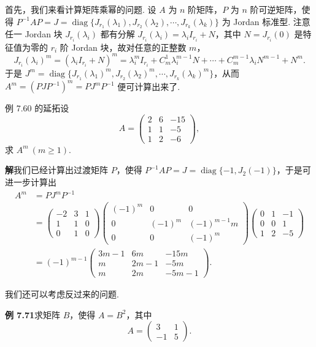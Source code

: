 \documentclass[UTF8,12pt,a4paper,fontset=fandol]{ctexart}
\begin{document}
首先，我们来看计算矩阵乘幂的问题. 设 $A$ 为 $n$ 阶矩阵，$P$ 为 $n$ 阶可逆矩阵，使得 $P^{-1}AP=J=\operatorname{diag}\{J_{r_1}(\lambda_1),J_{r_2}(\lambda_2),\cdots,J_{r_k}(\lambda_k)\}$ 为 Jordan 标准型. 注意任一 Jordan 块 $J_{r_i}(\lambda_i)$ 都有分解 $J_{r_i}(\lambda_i)=\lambda_iI_{r_i}+N$，其中 $N=J_{r_i}(0)$ 是特征值为零的 $r_i$ 阶 Jordan 块，故对任意的正整数 $m$，
\[
J_{r_i}(\lambda_i)^m=(\lambda_iI_{r_i}+N)^m=\lambda_i^mI_{r_i}+C_m^1\lambda_i^{m-1}N+\cdots+C_m^{m-1}\lambda_iN^{m-1}+N^m.
\]
于是 $J^m=\operatorname{diag}\{J_{r_1}(\lambda_1)^m,J_{r_2}(\lambda_2)^m,\cdots,J_{r_k}(\lambda_k)^m\}$，从而 $A^m=(PJP^{-1})^m=PJ^mP^{-1}$ 便可计算出来了.

例 7.60 的延拓\quad 设
\[
A=\left(\begin{array}{rrr}
2&6&-15\\
1&1&-5\\
1&2&-6
\end{array}\right),
\]
求 $A^m\ (m\ge1)$.

\noindent\textbf{解}\quad 我们已经计算出过渡矩阵 $P$，使得 $P^{-1}AP=J=\operatorname{diag}\{-1,J_2(-1)\}$，于是可进一步计算出
\[
\begin{aligned}
A^m&=PJ^mP^{-1}\\
&=\left(\begin{array}{rrr}
-2&3&1\\
1&1&0\\
0&1&0
\end{array}\right)
\left(\begin{array}{ccc}
(-1)^m&0&0\\
0&(-1)^m&(-1)^{m-1}m\\
0&0&(-1)^m
\end{array}\right)
\left(\begin{array}{rrr}
0&1&-1\\
0&0&1\\
1&2&-5
\end{array}\right)\\
&=(-1)^{m-1}\left(\begin{array}{rrr}
3m-1&6m&-15m\\
m&2m-1&-5m\\
m&2m&-5m-1
\end{array}\right).
\end{aligned}
\]

我们还可以考虑反过来的问题.

\noindent\textbf{例 7.71}\quad 求矩阵 $B$，使得 $A=B^2$，其中
\[
A=\left(\begin{array}{rr}
3&1\\
-1&5
\end{array}\right).
\]
\end{document}
